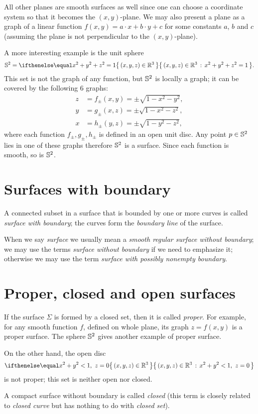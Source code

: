 All other planes are smooth surfaces as well since one can choose a coordinate system so that it becomes the $(x,y)$-plane.
We may also present a plane as a graph of a linear function 
$f(x,y)=a\cdot x+b\cdot y+c$ for some constants $a$, $b$ and $c$
(assuming the plane is not perpendicular to the $(x,y)$-plane).

A more interesting example is the unit sphere 
\[\SS^2=\set{(x,y,z)\in\RR^3}{x^2+y^2+z^2=1}.\]
This set is not the graph of any function,
but $\mathbb{S}^2$ is locally a graph;
it can be covered by the following 6 graphs:
\begin{align*}
z&=f_\pm(x,y)=\pm \sqrt{1-x^2-y^2},
\\
y&=g_\pm(x,z)=\pm \sqrt{1-x^2-z^2},
\\
x&=h_\pm(y,z)=\pm \sqrt{1-y^2-z^2},
\end{align*}
where each function $f_\pm,g_\pm,h_\pm$ is defined in an open unit disc.
Any point $p\in\mathbb{S}^2$ lies in one of these graphs therefore $\mathbb{S}^2$ is a surface.
Since each function is smooth, so is $\mathbb{S}^2$.

\section{Surfaces with boundary}
A connected subset in a surface that is bounded by one or more 
curves is called \emph{surface with boundary}; the curves form the \emph{boundary line} of the surface.

When we say {}\emph{surface} we usually mean a {}\emph{smooth regular surface without boundary};
we may use the terms {}\emph{surface without boundary} if we need to emphasize it;
otherwise we may use the term {}\emph{surface with possibly nonempty boundary}.

\section{Proper, closed and open surfaces}
If the surface $\Sigma$ is formed by a closed set, then it is called \emph{proper}.
For example, for any smooth function $f$, defined on whole plane, its graph $z=f(x,y)$ is a proper surface.
The sphere $\mathbb{S}^2$ gives another example of proper surface.

On the other hand, the open disc 
\[\set{(x,y,z)\in\RR^3}{x^2+y^2<1,\  z=0}\]
is not proper; this set is neither open nor closed.

A compact surface without boundary is called \emph{closed}
(this term is closely related to {}\emph{closed curve} but has nothing to do with {}\emph{closed set}).

